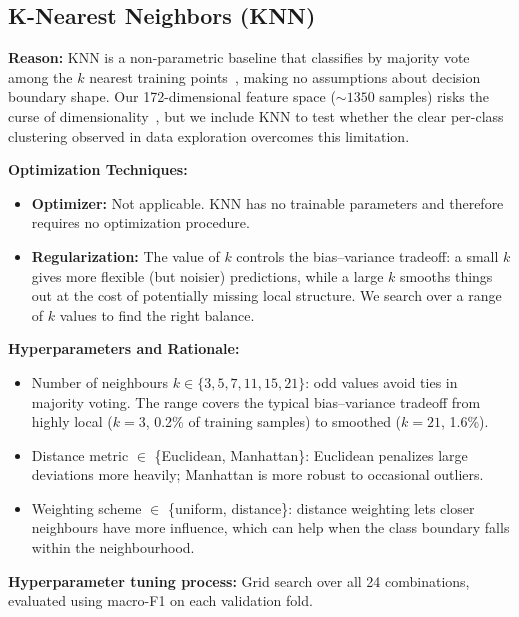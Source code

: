 \documentclass[12pt]{article}
\begin{document}
\subsection{K-Nearest Neighbors (KNN)}

\textbf{Reason:} KNN is a non-parametric baseline that classifies by majority vote among the $k$ nearest training points~\cite{hastie2009esl}, making no assumptions about decision boundary shape. Our 172-dimensional feature space (${\sim}1350$ samples) risks the curse of dimensionality~\cite{bishop2006prml}, but we include KNN to test whether the clear per-class clustering observed in data exploration overcomes this limitation.

\textbf{Optimization Techniques:}
    \begin{itemize}
        \item \textbf{Optimizer:} Not applicable. KNN has no trainable parameters and therefore requires no optimization procedure. 
        \item \textbf{Regularization:} The value of $k$ controls the bias--variance tradeoff: a small $k$ gives more flexible (but noisier) predictions, while a large $k$ smooths things out at the cost of potentially missing local structure. We search over a range of $k$ values to find the right balance.
    \end{itemize}
\textbf{Hyperparameters and Rationale:}
    \begin{itemize}
        \item Number of neighbours $k \in \{3, 5, 7, 11, 15, 21\}$: odd values avoid ties in majority voting. The range covers the typical bias--variance tradeoff from highly local ($k{=}3$, 0.2\% of training samples) to smoothed ($k{=}21$, 1.6\%).
        \item Distance metric $\in$ \{Euclidean, Manhattan\}: Euclidean penalizes large deviations more heavily; Manhattan is more robust to occasional outliers.
        \item Weighting scheme $\in$ \{uniform, distance\}: distance weighting lets closer neighbours have more influence, which can help when the class boundary falls within the neighbourhood.
    \end{itemize}
\textbf{Hyperparameter tuning process:} Grid search over all 24 combinations, evaluated using macro-F1 on each validation fold.
\end{document}

